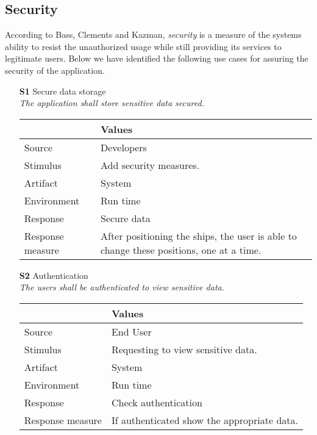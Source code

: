 \subsection{Security}
According to Bass, Clements and Kazman, \emph{security} is a measure of the systems ability to resist the unauthorized usage while still providing its services to legitimate users\citep{ProgarkPensum}. Below we have identified the following use cases for assuring the security of the application.
\begin{itemize}
    \item[\textbf{S1}] Secure data storage \\
    \textit{\small{The application shall store sensitive data secured.}}
        
    \begin{tabular}{| l | p{7cm} |}
        \hline
        \rowcolor[gray]{0.8}
        \textbf{} & \textbf{Values} \\
        \hline
        Source & Developers \\
        Stimulus & Add security measures. \\
        Artifact & System \\
        Environment & Run time \\
        Response & Secure data  \\
        Response measure & After positioning the ships, the user is able to change these positions, one at a time. \\
        \hline
    \end{tabular}

    \item[\textbf{S2}] Authentication \\
    \textit{\small{The users shall be authenticated to view sensitive data.}}
        
    \begin{tabular}{| l | p{7cm} |}
        \hline
        \rowcolor[gray]{0.8}
        \textbf{} & \textbf{Values} \\
        \hline
        Source & End User \\
        Stimulus & Requesting to view sensitive data. \\
        Artifact & System \\
        Environment & Run time \\
        Response & Check authentication \\
        Response measure & If authenticated show the appropriate data. \\
        \hline
    \end{tabular}
\end{itemize}